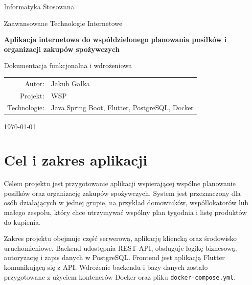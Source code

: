 \documentclass[12pt,a4paper]{article}
\begin{document}
\begin{titlepage}
    \centering
    \vspace*{2cm}

    {\Large Informatyka Stosowana\par}
    \vspace{0.6cm}
    {\large Zaawansowane Technologie Internetowe\par}

    \vspace{2.5cm}
    {\LARGE\bfseries Aplikacja internetowa do współdzielonego planowania posiłków i organizacji zakupów spożywczych\par}

    \vspace{2cm}
    {\large Dokumentacja funkcjonalna i wdrożeniowa\par}

    \vfill

    \begin{tabular}{rl}
        Autor: & Jakub Gałka \\
        Projekt: & WSP \\
        Technologie: & Java Spring Boot, Flutter, PostgreSQL, Docker \\
    \end{tabular}

    \vspace{2cm}
    {\large \today\par}
\end{titlepage}

\tableofcontents
\newpage

\section{Cel i zakres aplikacji}

Celem projektu jest przygotowanie aplikacji wspierającej wspólne planowanie posiłków oraz organizację zakupów spożywczych. System jest przeznaczony dla osób działających w jednej grupie, na przykład domowników, współlokatorów lub małego zespołu, który chce utrzymywać wspólny plan tygodnia i listę produktów do kupienia.

Zakres projektu obejmuje część serwerową, aplikację kliencką oraz środowisko uruchomieniowe. Backend udostępnia REST API, obsługuje logikę biznesową, autoryzację i zapis danych w PostgreSQL. Frontend jest aplikacją Flutter komunikującą się z API. Wdrożenie backendu i bazy danych zostało przygotowane z użyciem kontenerów Docker oraz pliku \texttt{docker-compose.yml}.
\end{document}
